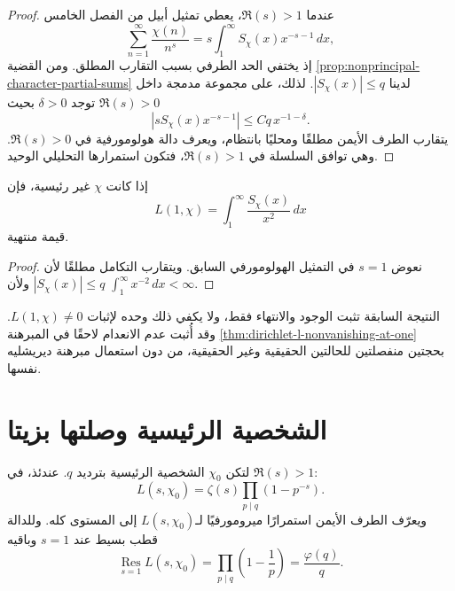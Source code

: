 \begin{proof}
عندما \(\Re(s)>1\)، يعطي تمثيل أبيل من الفصل الخامس
\[
\sum_{n=1}^{\infty}\frac{\chi(n)}{n^s}
=
s\int_1^{\infty}S_\chi(x)x^{-s-1}\,dx,
\]
إذ يختفي الحد الطرفي بسبب التقارب المطلق. ومن القضية
\ref{prop:nonprincipal-character-partial-sums} لدينا
\(|S_\chi(x)|\leq q\). لذلك، على مجموعة مدمجة داخل \(\Re(s)>0\)
توجد \(\delta>0\) بحيث
\[
|sS_\chi(x)x^{-s-1}|
\leq Cq\,x^{-1-\delta}.
\]
يتقارب الطرف الأيمن مطلقًا ومحليًا بانتظام، ويعرف دالة هولومورفية في
\(\Re(s)>0\). وهي توافق السلسلة في \(\Re(s)>1\)، فتكون استمرارها
التحليلي الوحيد.
\end{proof}

\begin{corollary}
\label{cor:nonprincipal-l-at-one-exists}
\provedhere
إذا كانت \(\chi\) غير رئيسية، فإن
\[
L(1,\chi)
=
\int_1^{\infty}\frac{S_\chi(x)}{x^2}\,dx
\]
قيمة منتهية.
\end{corollary}

\begin{proof}
نعوض \(s=1\) في التمثيل الهولومورفي السابق. ويتقارب التكامل مطلقًا لأن
\(|S_\chi(x)|\leq q\) ولأن \(\int_1^\infty x^{-2}\,dx<\infty\).
\end{proof}

\begin{remark}
النتيجة السابقة تثبت الوجود والانتهاء فقط، ولا يكفي ذلك وحده لإثبات
\(L(1,\chi)\ne0\). وقد أُثبت عدم الانعدام لاحقًا في المبرهنة
\ref{thm:dirichlet-l-nonvanishing-at-one} بحجتين منفصلتين للحالتين
الحقيقية وغير الحقيقية، من دون استعمال مبرهنة ديريشليه نفسها.
\end{remark}

\section{الشخصية الرئيسية وصلتها بزيتا}

\begin{proposition}
\label{prop:principal-character-zeta-factorization}
\provedhere
لتكن \(\chi_0\) الشخصية الرئيسية بترديد \(q\). عندئذ، في
\(\Re(s)>1\):
\[
L(s,\chi_0)
=
\zeta(s)\prod_{p\mid q}(1-p^{-s}).
\]
ويعرّف الطرف الأيمن استمرارًا ميرومورفيًا لـ\(L(s,\chi_0)\) إلى المستوى
كله. وللدالة قطب بسيط عند \(s=1\) وباقيه
\[
\operatorname*{Res}_{s=1}L(s,\chi_0)
=
\prod_{p\mid q}\left(1-\frac1p\right)
=
\frac{\varphi(q)}{q}.
\]
\end{proposition}


